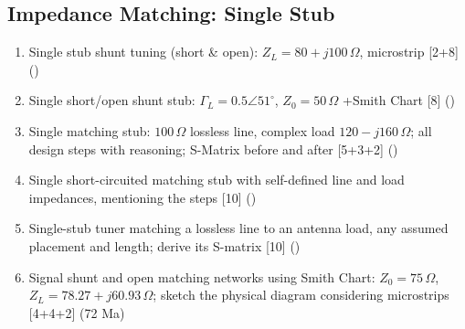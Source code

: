 \documentclass[12pt]{article}
\begin{document}
  \subsection{Impedance Matching: Single Stub}
    \begin{enumerate}[topsep=0pt, noitemsep]
      \item Single stub shunt tuning (short \& open): $Z_L = 80{+}j100\,\Omega$, microstrip \hfill [2+8] ()
      \item Single short/open shunt stub: $\Gamma_L = 0.5\angle51^\circ$, $Z_0 = 50\,\Omega$ +Smith Chart \hfill [8] ()
      \item Single matching stub: $100\,\Omega$ lossless line, complex load $120{-}j160\,\Omega$; all design steps with reasoning; S-Matrix before and after \hfill [5+3+2] ()
      \item Single short-circuited matching stub with self-defined line and load impedances, mentioning the steps \hfill [10] ()
      \item Single-stub tuner matching a lossless line to an antenna load, any assumed placement and length; derive its S-matrix \hfill [10] ()
      \item Signal shunt and open matching networks using Smith Chart: $Z_0 = 75\,\Omega$, $Z_L = 78.27{+}j60.93\,\Omega$; sketch the physical diagram considering microstrips \hfill [4+4+2] (72 Ma)
    \end{enumerate}
\end{document}
